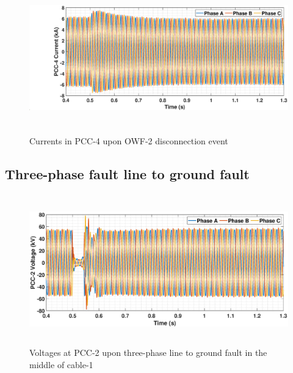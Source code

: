 \begin{figure}[H]
    \includegraphics[height = 6.5cm,width = \textwidth]{Diagrams/Appendix_C/IABC_WT4_WT2off.eps}
    \caption{Currents in PCC-4 upon OWF-2 disconnection event}
    \label{IABC_WT4_WT2off}
\end{figure}

\subsection{Three-phase fault line to ground fault}

\begin{figure}[H]
    \includegraphics[height = 6.5cm,width = \textwidth]{Diagrams/Appendix_C/VABC_WT2_3phaseSC.eps}
    \caption{Voltages at PCC-2 upon three-phase line to ground fault in the middle of cable-1}
    \label{VABC_WT2_3phaseSC}
\end{figure}

